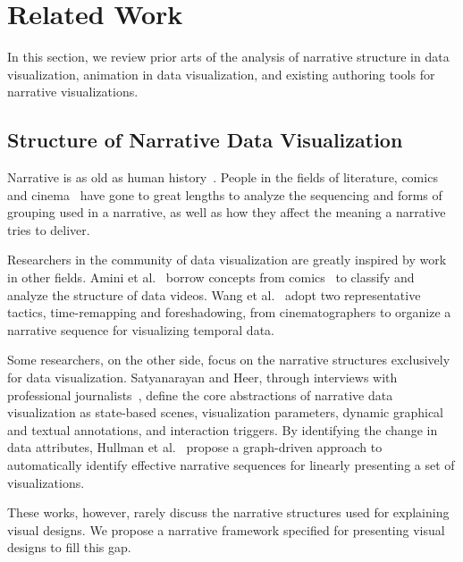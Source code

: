 \section {Related Work}
In this section, we review prior arts of the analysis of narrative structure in data visualization, animation in data visualization, and existing authoring tools for narrative visualizations.

\subsection{Structure of Narrative Data Visualization}
Narrative is as old as human history~\cite{cunningham_culture_2009}.  People in the fields of literature, comics~\cite{cohn_visual_2013} and cinema~\cite{schmidt_living_2017} have gone to great lengths to analyze the sequencing and forms of grouping used in a narrative, as well as how they affect the meaning a narrative tries to deliver. 

Researchers in the community of data visualization are greatly inspired by work in other fields.
Amini et al.~\cite{amini_understanding_2015} borrow concepts from comics~\cite{cohn_visual_2013} to classify and analyze the structure of data videos. Wang et al.~\cite{wang_animated_2016} adopt two representative tactics, time-remapping and foreshadowing, from cinematographers to organize a narrative sequence for visualizing temporal data. 

Some researchers, on the other side, focus on the narrative structures exclusively for data visualization. 
Satyanarayan and Heer, through interviews with professional journalists~\cite{satyanarayan_authoring_2014}, define the core abstractions of narrative data visualization as state-based scenes, visualization parameters, dynamic graphical and textual annotations, and interaction triggers. By identifying the change in data attributes, Hullman et al.~\cite{hullman_deeper_2013} propose a graph-driven approach to automatically identify effective narrative sequences for linearly presenting a set of visualizations. 

These works, however, rarely discuss the narrative structures used for explaining visual designs. We propose a narrative framework specified for presenting visual designs to fill this gap.

